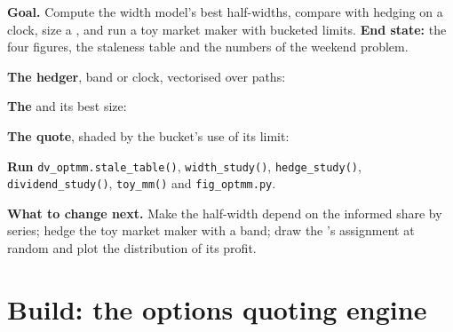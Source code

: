 \begin{tutorial}
\textbf{Goal.} Compute the width model's best half-widths, compare  with hedging on a clock, size a , and run a toy market maker with
bucketed limits. \textbf{End state:} the four figures, the staleness table and the numbers of the weekend problem.
\begin{tutsteps}
\item \textbf{The hedger}, band or clock, vectorised over paths:
\label{lst:dv:options-market-making-in-practice:hedge}
\item \textbf{The } and its best size:
\label{lst:dv:options-market-making-in-practice:play}
\item \textbf{The quote}, shaded by the bucket's use of its limit:
\label{lst:dv:options-market-making-in-practice:quote}
\item \textbf{Run} \texttt{dv\_optmm.stale\_table()}, \texttt{width\_study()}, \texttt{hedge\_study()}, \texttt{dividend\_study()}, \texttt{toy\_mm()} and
\texttt{fig\_optmm.py}.
\end{tutsteps}
\textbf{What to change next.} Make the half-width depend on the informed share by series; hedge the toy market maker with a band; draw the 's
assignment at random and plot the distribution of its profit.
\end{tutorial}

\section{Build: the options quoting engine}\label{bld:dv:options-market-making-in-practice:optmm}

